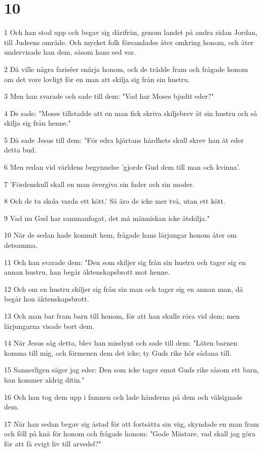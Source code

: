 \chapter{10}

\par 1 Och han stod upp och begav sig därifrån, genom landet på andra sidan Jordan, till Judeens område. Och mycket folk församlades åter omkring honom, och åter undervisade han dem, såsom hans sed var.
\par 2 Då ville några fariséer snärja honom, och de trädde fram och frågade honom om det vore lovligt för en man att skilja sig från sin hustru.
\par 3 Men han svarade och sade till dem: "Vad har Moses bjudit eder?"
\par 4 De sade: "Moses tillstadde att en man fick skriva skiljebrev åt sin hustru och så skilja sig från henne."
\par 5 Då sade Jesus till dem: "För edra hjärtans hårdhets skull skrev han åt eder detta bud.
\par 6 Men redan vid världens begynnelse 'gjorde Gud dem till man och kvinna'.
\par 7 'Fördenskull skall en man övergiva sin fader och sin moder.
\par 8 Och de tu skola varda ett kött.' Så äro de icke mer två, utan ett kött.
\par 9 Vad nu Gud har sammanfogat, det må människan icke åtskilja."
\par 10 När de sedan hade kommit hem, frågade hans lärjungar honom åter om detsamma.
\par 11 Och han svarade dem: "Den som skiljer sig från sin hustru och tager sig en annan hustru, han begår äktenskapsbrott mot henne.
\par 12 Och om en hustru skiljer sig från sin man och tager sig en annan man, då begår hon äktenskapsbrott.
\par 13 Och man bar fram barn till honom, för att han skulle röra vid dem; men lärjungarna visade bort dem.
\par 14 När Jesus såg detta, blev han misslynt och sade till dem: "Låten barnen komma till mig, och förmenen dem det icke; ty Guds rike hör sådana till.
\par 15 Sannerligen säger jag eder: Den som icke tager emot Guds rike såsom ett barn, han kommer aldrig ditin."
\par 16 Och han tog dem upp i famnen och lade händerna på dem och välsignade dem.
\par 17 När han sedan begav sig åstad för att fortsätta sin väg, skyndade en man fram och föll på knä för honom och frågade honom: "Gode Mästare, vad skall jag göra för att få evigt liv till arvedel?"
